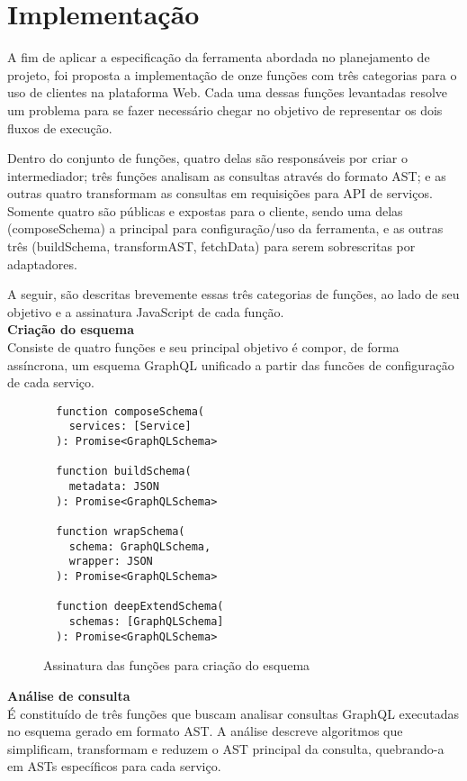 \section{Implementação}

A fim de aplicar a especificação da ferramenta abordada no planejamento de projeto, foi proposta a implementação de onze funções com três categorias para o uso de clientes na plataforma Web. Cada uma dessas funções levantadas resolve um problema para se fazer necessário chegar no objetivo de representar os dois fluxos de execução.

Dentro do conjunto de funções, quatro delas são responsáveis por criar o intermediador; três funções analisam as consultas através do formato AST; e as outras quatro transformam as consultas em requisições para API de serviços. Somente quatro são públicas e expostas para o cliente, sendo uma delas (composeSchema) a principal para configuração/uso da ferramenta, e as outras três (buildSchema, transformAST, fetchData) para serem sobrescritas por adaptadores.

A seguir, são descritas brevemente essas três categorias de funções, ao lado de seu objetivo e a assinatura JavaScript de cada função. \\

\textbf{Criação do esquema} \\

Consiste de quatro funções e seu principal objetivo é compor, de forma assíncrona, um esquema GraphQL unificado a partir das funcões de configuração de cada serviço.

\begin{figure}[H]
  \centering
  \begin{verbatim}
  function composeSchema(
    services: [Service]
  ): Promise<GraphQLSchema>

  function buildSchema(
    metadata: JSON
  ): Promise<GraphQLSchema>

  function wrapSchema(
    schema: GraphQLSchema,
    wrapper: JSON
  ): Promise<GraphQLSchema>

  function deepExtendSchema(
    schemas: [GraphQLSchema]
  ): Promise<GraphQLSchema>
  \end{verbatim}
  \caption{Assinatura das funções para criação do esquema}
\end{figure}

\textbf{Análise de consulta} \\

É constituído de três funções que buscam analisar consultas GraphQL executadas no esquema gerado em formato AST. A análise descreve algoritmos que simplificam, transformam e reduzem o AST principal da consulta, quebrando-a em ASTs específicos para cada serviço.

